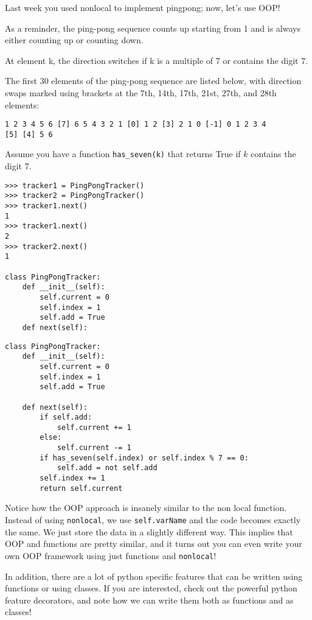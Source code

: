 \begin{blocksection}
\question Last week you used nonlocal to implement pingpong; now, let's use OOP!

As a reminder, the ping-pong sequence counts up starting from 1 and is
always either counting up or counting down.

At element k, the direction switches if k is a multiple of 7 or contains the
digit 7.

The first 30 elements of the ping-pong sequence are listed below, with direction
swaps marked using brackets at the 7th, 14th, 17th, 21st, 27th, and 28th
elements:
\begin{lstlisting}
1 2 3 4 5 6 [7] 6 5 4 3 2 1 [0] 1 2 [3] 2 1 0 [-1] 0 1 2 3 4
[5] [4] 5 6
\end{lstlisting}

Assume you have a function \texttt{has\_seven(k)} that returns True if $k$ contains the digit 7.

\vspace{2\baselineskip}
\begin{nonsol}
\begin{lstlisting}
>>> tracker1 = PingPongTracker()
>>> tracker2 = PingPongTracker()
>>> tracker1.next()
1
>>> tracker1.next()
2
>>> tracker2.next()
1

class PingPongTracker:
    def __init__(self):
        self.current = 0
        self.index = 1
        self.add = True
    def next(self):
\end{lstlisting}
\end{nonsol}

\begin{solution}[0.3in]
\begin{lstlisting}
class PingPongTracker:
    def __init__(self):
        self.current = 0
        self.index = 1
        self.add = True

    def next(self):
        if self.add:
            self.current += 1
        else:
            self.current -= 1
        if has_seven(self.index) or self.index % 7 == 0:
            self.add = not self.add
        self.index += 1
        return self.current

\end{lstlisting}
Notice how the OOP approach is insanely similar to the non local function.
Instead of using \texttt{nonlocal}, we use \texttt{self.varName} and the code
becomes exactly the same. We just store the data in a slightly different way.
This implies that OOP and functions are pretty similar, and it turns out you can
even write your own OOP framework using just functions and \texttt{nonlocal}!

In addition, there are a lot of python specific features that can be written
using functions or using classes. If you are interested, check out the powerful
python feature decorators, and note how we can write them both as functions and
as classes!
\end{solution}

\end{blocksection}
